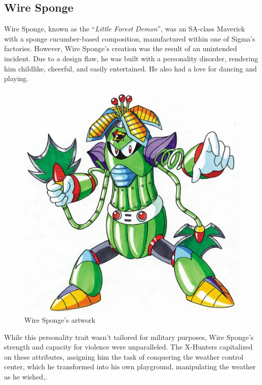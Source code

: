 \subsection{Wire Sponge}\label{boss:Wire_sponge}
Wire Sponge, known as the ``\textit{Little Forest Demon}''\cite{book:MMX_Complete_art}, was an SA-class Maverick with a sponge cucumber-based composition, manufactured within one of Sigma's factories. However, Wire Sponge's creation was the result of an unintended incident. Due to a design flaw, he was built with a personality disorder, rendering him childlike, cheerful, and easily entertained. He also had a love for dancing and playing.
\begin{figure}[htp]
	\centering
	\includegraphics[height=\portraitsize]{figures/X2/Wire_sponge/Wire_Sponge.png}
	\caption{Wire Sponge's artwork~\cite{book:MMX_Complete_art}}
\end{figure}
 While this personality trait wasn't tailored for military purposes, Wire Sponge's strength and capacity for violence were unparalleled. The X-Hunters capitalized on these attributes, assigning him the task of conquering the weather control center, which he transformed into his own playground, manipulating the weather as he wished\cite{wiki:wire_sponge},\cite{wayback:X2_resources}.
